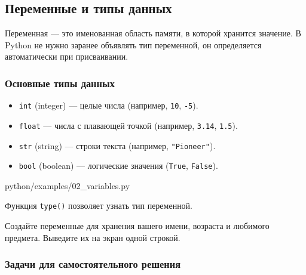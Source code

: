 \subsection{Переменные и типы данных}

Переменная — это именованная область памяти, в которой хранится значение. В Python не нужно заранее объявлять тип переменной, он определяется автоматически при присваивании.

\subsubsection*{Основные типы данных}
\begin{itemize}
    \item \texttt{int} (integer) — целые числа (например, \texttt{10}, \texttt{-5}).
    \item \texttt{float} — числа с плавающей точкой (например, \texttt{3.14}, \texttt{1.5}).
    \item \texttt{str} (string) — строки текста (например, \texttt{"Pioneer"}).
    \item \texttt{bool} (boolean) — логические значения (\texttt{True}, \texttt{False}).
\end{itemize}

\begin{codefile}[python]{python/examples/02_variables.py}
\end{codefile}

Функция \texttt{type()} позволяет узнать тип переменной.

\begin{taskbox}
Создайте переменные для хранения вашего имени, возраста и любимого предмета. Выведите их на экран одной строкой.
\end{taskbox}

\subsubsection*{Задачи для самостоятельного решения}

